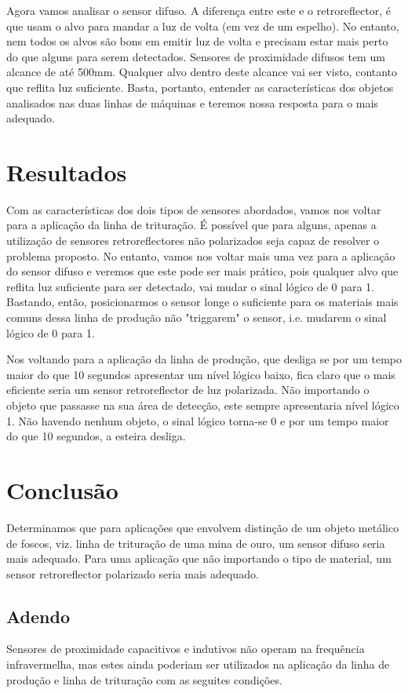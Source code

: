 \documentclass{article}
\begin{document}
Agora vamos analisar o sensor difuso. A diferença entre este e o retroreflector, é que usam o alvo para mandar a luz de volta (em vez de um espelho). No entanto, nem todos os alvos são bons em emitir luz de volta e precisam estar mais perto do que alguns para serem detectados. Sensores de proximidade difusos tem um alcance de até 500mm. Qualquer alvo dentro deste alcance vai ser visto, contanto que reflita luz suficiente. 
Basta, portanto, entender as características dos objetos analisados nas duas linhas de máquinas e teremos nossa resposta para o mais adequado.


\section{Resultados}
Com as características dos dois tipos de sensores abordados, vamos nos voltar para a aplicação da linha de trituração. É possível que para alguns, apenas a utilização de sensores retroreflectores não polarizados seja capaz de resolver o problema proposto. No entanto, vamos nos voltar mais uma vez para a aplicação do sensor difuso e veremos que este pode ser mais prático, pois qualquer alvo que reflita luz suficiente para ser detectado, vai mudar o sinal lógico de 0 para 1. Bastando, então, posicionarmos o sensor longe o suficiente para os materiais mais comuns dessa linha de produção não "triggarem" o sensor, i.e. mudarem o sinal lógico de 0 para 1.

Nos voltando para a aplicação da linha de produção, que desliga se por um tempo maior do que 10 segundos apresentar um nível lógico baixo, fica claro que o mais eficiente seria um sensor retroreflector de luz polarizada. Não importando o objeto que passasse na sua área de detecção, este sempre apresentaria nível lógico 1. Não havendo nenhum objeto, o sinal lógico torna-se 0 e por um tempo maior do que 10 segundos, a esteira desliga.
\section{Conclusão}
Determinamos que para aplicações que envolvem distinção de um objeto metálico de foscos, viz. linha de trituração de uma mina de ouro, um sensor difuso seria mais adequado. Para uma aplicação que não importando o tipo de material, um sensor retroreflector polarizado seria mais adequado.

\subsection{Adendo}
Sensores de proximidade capacitivos e indutivos não operam na frequência infravermelha, mas estes ainda poderiam ser utilizados na aplicação da linha de produção e linha de trituração com as seguites condições. 
\end{document}

